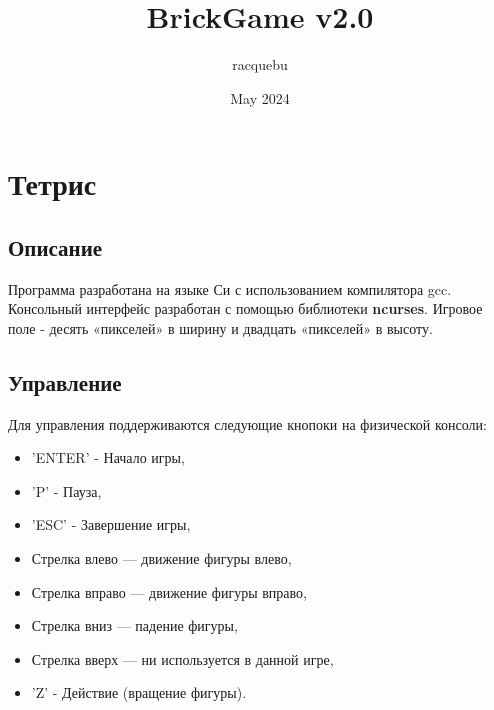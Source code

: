\documentclass{article}
\title{BrickGame v2.0}
\author{racquebu}
\date{May 2024}
\begin{document}
\maketitle
\section{Тетрис}
\subsection{Описание}
\small Программа разработана на языке Си с использованием  компилятора gcc. Консольный интерфейс разработан с помощью библиотеки \textbf{ncurses}. 
Игровое поле - десять «пикселей» в ширину и двадцать «пикселей» в высоту.

\subsection{Управление}
Для управления поддерживаются следующие кнопоки на физической консоли:
\begin{itemize}
    \item 'ENTER' - Начало игры,
    \item 'P' - Пауза,
    \item 'ESC' - Завершение игры,
    \item Стрелка влево — движение фигуры влево,
    \item Стрелка вправо — движение фигуры вправо,
    \item Стрелка вниз — падение фигуры,
    \item Стрелка вверх — ни используется в данной игре,
    \item 'Z' - Действие (вращение фигуры).

\end{itemize}
\end{document}
